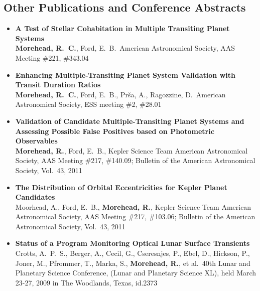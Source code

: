 \documentclass[11pt,letterpaper,sans]{moderncv} %
\begin{document}
\newpage
\subsection{Other Publications and Conference Abstracts}
\begin{itemize}
 \item \textbf{ A Test of Stellar Cohabitation in Multiple Transiting 
Planet Systems } \\ \textbf{Morehead, R.~C.}, Ford, E.~B.\ American Astronomical 
Society, AAS Meeting \#221, \#343.04 \\ 


 \item \textbf{ Enhancing Multiple-Transiting Planet System Validation with 
Transit Duration Ratios } \\ \textbf{Morehead, R.~C.}, Ford, E.~B., Pr{\v s}a, A., 
Ragozzine, D.\ American Astronomical Society, ESS meeting \#2, \#28.01 \\ 


 \item \textbf{ Validation of Candidate Multiple-Transiting Planet Systems 
and Assessing Possible False Positives based on Photometric Observables } 
\\ \textbf{Morehead, R.}, Ford, E.~B., Kepler Science Team American Astronomical 
Society, AAS Meeting \#217, \#140.09; Bulletin of the American 
Astronomical Society, Vol.~43, 2011 \\ 

 \item \textbf{ The Distribution of Orbital Eccentricities for Kepler 
Planet Candidates } \\ Moorhead, A., Ford, E.~B., \textbf{Morehead, R.}, Kepler 
Science Team American Astronomical Society, AAS Meeting \#217, \#103.06; 
Bulletin of the American Astronomical Society, Vol.~43, 2011 \\ 

 \item \textbf{ Status of a Program Monitoring Optical Lunar Surface 
Transients } \\ Crotts, A.~P.~S., Berger, A., Cecil, G., Cseresnjes, P., 
Ebel, D., Hickson, P., Joner, M., Pfrommer, T., Marka, S., \textbf{ Morehead, R.}, et 
al.\ 40th Lunar and Planetary Science Conference, (Lunar and Planetary 
Science XL), held March 23-27, 2009 in The Woodlands, Texas, id.2373 \\ 
\end{itemize}
\end{document}
